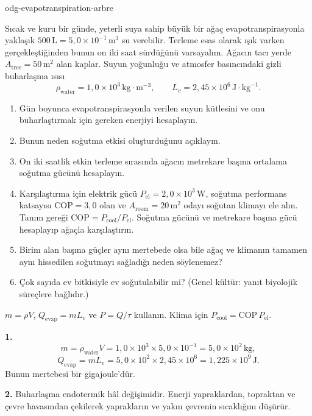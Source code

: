 \begin{exo}{odg-evapotranspiration-arbre}

Sıcak ve kuru bir günde, yeterli suya sahip büyük bir ağaç evapotranspirasyonla yaklaşık $500\,\text{L}=5{,}0\times10^{-1}\,\text{m}^3$ su verebilir. Terleme esas olarak ışık varken gerçekleştiğinden bunun on iki saat sürdüğünü varsayalım. Ağacın tacı yerde $A_{\text{tree}}=50\,\text{m}^2$ alan kaplar. Suyun yoğunluğu ve atmosfer basıncındaki gizli buharlaşma ısısı
\[
\rho_{\text{water}}=1{,}0\times10^3\,\text{kg}\!\cdot\!\text{m}^{-3},
\qquad L_v=2{,}45\times10^6\,\text{J}\!\cdot\!\text{kg}^{-1}.
\]
\begin{enumerate}
  \item Gün boyunca evapotranspirasyonla verilen suyun kütlesini ve onu buharlaştırmak için gereken enerjiyi hesaplayın.
  \item Bunun neden soğutma etkisi oluşturduğunu açıklayın.
  \item On iki saatlik etkin terleme sırasında ağacın metrekare başına ortalama soğutma gücünü hesaplayın.
  \item Karşılaştırma için elektrik gücü $P_{\mathrm{el}}=2{,}0\times10^3\,\text{W}$, soğutma performans katsayısı $\mathrm{COP}=3{,}0$ olan ve $A_{\text{room}}=20\,\text{m}^2$ odayı soğutan klimayı ele alın. Tanım gereği $\mathrm{COP}=P_{\text{cool}}/P_{\mathrm{el}}$. Soğutma gücünü ve metrekare başına gücü hesaplayıp ağaçla karşılaştırın.
  \item Birim alan başına güçler aynı mertebede olsa bile ağaç ve klimanın tamamen aynı hissedilen soğutmayı sağladığı neden söylenemez?
  \item Çok sayıda ev bitkisiyle ev soğutulabilir mi? (Genel kültür: yanıt biyolojik süreçlere bağlıdır.)
\end{enumerate}
\begin{indication}
$m=\rho V$, $Q_{\mathrm{evap}}=mL_v$ ve $P=Q/\tau$ kullanın. Klima için $P_{\text{cool}}=\mathrm{COP}\,P_{\mathrm{el}}$.
\end{indication}
\begin{solution}
\textbf{1.}
\[
m=\rho_{\text{water}}V=1{,}0\times10^3\times5{,}0\times10^{-1}
=5{,}0\times10^2\,\text{kg},
\]
\[
Q_{\mathrm{evap}}=mL_v=5{,}0\times10^2\times2{,}45\times10^6
=1{,}225\times10^9\,\text{J}.
\]
Bunun mertebesi bir gigajoule'dür.

\textbf{2.} Buharlaşma endotermik hâl değişimidir. Enerji yapraklardan, topraktan ve çevre havasından çekilerek yaprakların ve yakın çevrenin sıcaklığını düşürür.


\end{solution}
\end{exo}
